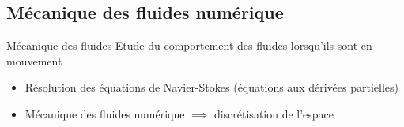 \documentclass{beamer}
\begin{document}
\subsection{Mécanique des fluides numérique}
\begin{frame}
  \begin{block}{Mécanique des fluides}
    Etude du comportement des fluides lorsqu'ils sont en mouvement
  \end{block}
  
  \begin{itemize}
  \item Résolution des équations de Navier-Stokes (équations aux dérivées partielles)
  \item Mécanique des fluides numérique $\implies$ discrétisation de l'espace
  \end{itemize}
\end{frame}
\end{document}
